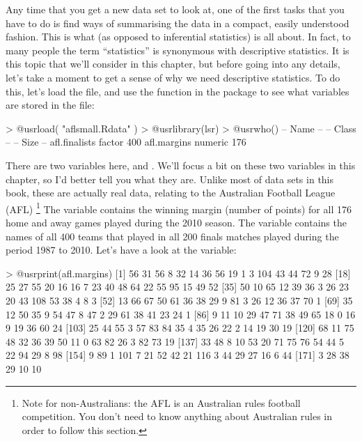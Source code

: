 Any time that you get a new data set to look at, one of the first tasks that you have to do is find ways of summarising the data in a compact, easily understood fashion. This is what  (as opposed to inferential statistics) is all about. In fact, to many people the term ``statistics'' is synonymous with descriptive statistics. It is this topic that we'll consider in this chapter, but before going into any details, let's take a moment to get a sense of why we need descriptive statistics. To do this, let's load the  file, and use the  function in the  package to see what variables are stored in the file:
\begin{rblock1}
> @usr{load( "aflsmall.Rdata" )}
> @usr{library(lsr)}
> @usr{who()}
   -- Name --      -- Class --   -- Size --
   afl.finalists   factor        400       
   afl.margins     numeric       176     
\end{rblock1}
There are two variables here,  and . We'll focus a bit on these two variables in this chapter, so I'd better tell you what they are. Unlike most of data sets in this book, these are actually real data, relating to the Australian Football League (AFL) \footnote{Note for non-Australians: the AFL is an Australian rules football competition. You don't need to know anything about Australian rules in order to follow this section.} The  variable contains the winning margin (number of points) for all 176 home and away games played during the 2010 season. The  variable contains the names of all 400 teams that played in all 200 finals matches played during the period 1987 to 2010.  Let's have a look at the  variable:
\begin{rblock1}
> @usr{print(afl.margins)}
  [1]  56  31  56   8  32  14  36  56  19   1   3 104  43  44  72   9  28
 [18]  25  27  55  20  16  16   7  23  40  48  64  22  55  95  15  49  52
 [35]  50  10  65  12  39  36   3  26  23  20  43 108  53  38   4   8   3
 [52]  13  66  67  50  61  36  38  29   9  81   3  26  12  36  37  70   1
 [69]  35  12  50  35   9  54  47   8  47   2  29  61  38  41  23  24   1
 [86]   9  11  10  29  47  71  38  49  65  18   0  16   9  19  36  60  24
[103]  25  44  55   3  57  83  84  35   4  35  26  22   2  14  19  30  19
[120]  68  11  75  48  32  36  39  50  11   0  63  82  26   3  82  73  19
[137]  33  48   8  10  53  20  71  75  76  54  44   5  22  94  29   8  98
[154]   9  89   1 101   7  21  52  42  21 116   3  44  29  27  16   6  44
[171]   3  28  38  29  10  10
\end{rblock1}
